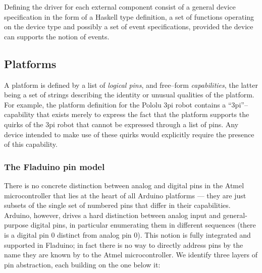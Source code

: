 \documentclass[a4paper, oneside, final]{memoir}
\begin{document}
Defining the driver for each external component consist of a general
device specification in the form of a Haskell type definition, a set
of functions operating on the device type and possibly a set of event
specifications, provided the device can supports the notion of events.


\subsection{Platforms}
\label{capabilities}
A platform is defined by a list of \textit{logical pins}, and
free--form \textit{capabilities}, the latter being a set of strings
describing the identity or unusual qualities of the platform.  For
example, the platform definition for the Pololu 3pi robot contains a
``3pi''--capability that exists merely to express the fact that the
platform supports the quirks of the 3pi robot that cannot be expressed
through a list of pins.  Any device intended to make use of these
quirks would explicitly require the presence of this capability.

\subsubsection{The Fladuino pin model}
\label{pins}
There is no concrete distinction between analog and digital pins in
the Atmel microcontroller that lies at the heart of all Arduino
platforms --- they are just subsets of the single set of numbered pins
that differ in their capabilities.  Arduino, however, drives a hard
distinction between analog input and general-purpose digital pins, in
particular enumerating them in different sequences (there is a digital
pin 0 distinct from analog pin 0).  This notion is fully integrated
and supported in Fladuino; in fact there is no way to directly address
pins by the name they are known by to the Atmel microcontroller.  We
identify three layers of pin abstraction, each building on the one
below it:
\end{document}
